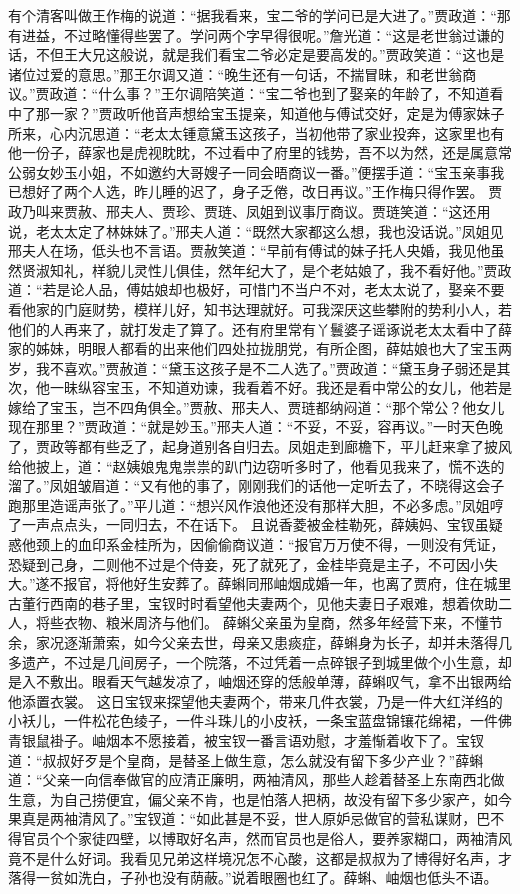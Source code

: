 \documentclass[12pt,oneside]{book}
\begin{document}
有个清客叫做王作梅的说道：“据我看来，宝二爷的学问已是大进了。”贾政道：“那有进益，不过略懂得些罢了。学问两个字早得很呢。”詹光道：“这是老世翁过谦的话，不但王大兄这般说，就是我们看宝二爷必定是要高发的。”贾政笑道：“这也是诸位过爱的意思。”那王尔调又道：“晚生还有一句话，不揣冒昧，和老世翁商议。”贾政道：“什么事？”王尔调陪笑道：“宝二爷也到了娶亲的年龄了，不知道看中了那一家？”贾政听他音声想给宝玉提亲，知道他与傅试交好，定是为傅家妹子所来，心内沉思道：“老太太锺意黛玉这孩子，当初他带了家业投奔，这家里也有他一份子，薛家也是虎视眈眈，不过看中了府里的钱势，吾不以为然，还是属意常公弱女妙玉小姐，不如邀约大哥嫂子一同会晤商议一番。”便摆手道：“宝玉亲事我已想好了两个人选，昨儿睡的迟了，身子乏倦，改日再议。”王作梅只得作罢。
贾政乃叫来贾赦、邢夫人、贾珍、贾琏、凤姐到议事厅商议。贾琏笑道：“这还用说，老太太定了林妹妹了。”邢夫人道：“既然大家都这么想，我也没话说。”凤姐见邢夫人在场，低头也不言语。贾赦笑道：“早前有傅试的妹子托人央婚，我见他虽然贤淑知礼，样貌儿灵性儿俱佳，然年纪大了，是个老姑娘了，我不看好他。”贾政道：“若是论人品，傅姑娘却也极好，可惜门不当户不对，老太太说了，娶亲不要看他家的门庭财势，模样儿好，知书达理就好。可我深厌这些攀附的势利小人，若他们的人再来了，就打发走了算了。还有府里常有丫鬟婆子谣诼说老太太看中了薛家的姊妹，明眼人都看的出来他们四处拉拢朋党，有所企图，薛姑娘也大了宝玉两岁，我不喜欢。”贾赦道：“黛玉这孩子是不二人选了。”贾政道：“黛玉身子弱还是其次，他一昧纵容宝玉，不知道劝谏，我看着不好。我还是看中常公的女儿，他若是嫁给了宝玉，岂不四角俱全。”贾赦、邢夫人、贾琏都纳闷道：“那个常公？他女儿现在那里？”贾政道：“就是妙玉。”邢夫人道：“不妥，不妥，容再议。”一时天色晚了，贾政等都有些乏了，起身道别各自归去。凤姐走到廊檐下，平儿赶来拿了披风给他披上，道：“赵姨娘鬼鬼祟祟的趴门边窃听多时了，他看见我来了，慌不迭的溜了。”凤姐皱眉道：“又有他的事了，刚刚我们的话他一定听去了，不晓得这会子跑那里造谣声张了。”平儿道：“想兴风作浪他还没有那样大胆，不必多虑。”凤姐哼了一声点点头，一同归去，不在话下。
且说香菱被金桂勒死，薛姨妈、宝钗虽疑惑他颈上的血印系金桂所为，因偷偷商议道：“报官万万使不得，一则没有凭证，恐疑到己身，二则他不过是个侍妾，死了就死了，金桂毕竟是主子，不可因小失大。”遂不报官，将他好生安葬了。薛蝌同邢岫烟成婚一年，也离了贾府，住在城里古董行西南的巷子里，宝钗时时看望他夫妻两个，见他夫妻日子艰难，想着佽助二人，将些衣物、粮米周济与他们。
薛蝌父亲虽为皇商，然多年经营下来，不懂节余，家况逐渐萧索，如今父亲去世，母亲又患痰症，薛蝌身为长子，却并未落得几多遗产，不过是几间房子，一个院落，不过凭着一点碎银子到城里做个小生意，却是入不敷出。眼看天气越发凉了，岫烟还穿的恁般单薄，薛蝌叹气，拿不出银两给他添置衣裳。
这日宝钗来探望他夫妻两个，带来几件衣裳，乃是一件大红洋绉的小袄儿，一件松花色绫子，一件斗珠儿的小皮袄，一条宝蓝盘锦镶花绵裙，一件佛青银鼠褂子。岫烟本不愿接着，被宝钗一番言语劝慰，才羞惭着收下了。宝钗道：“叔叔好歹是个皇商，是替圣上做生意，怎么就没有留下多少产业？”薛蝌道：“父亲一向信奉做官的应清正廉明，两袖清风，那些人趁着替圣上东南西北做生意，为自己捞便宜，偏父亲不肯，也是怕落人把柄，故没有留下多少家产，如今果真是两袖清风了。”宝钗道：“如此甚是不妥，世人原妒忌做官的营私谋财，巴不得官员个个家徒四壁，以博取好名声，然而官员也是俗人，要养家糊口，两袖清风竟不是什么好词。我看见兄弟这样境况怎不心酸，这都是叔叔为了博得好名声，才落得一贫如洗白，子孙也没有荫蔽。”说着眼圈也红了。薛蝌、岫烟也低头不语。
\end{document}
